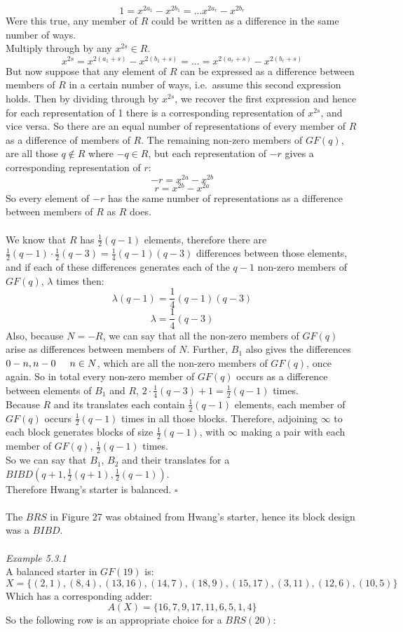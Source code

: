 \documentclass[
  12pt,
  a4paper]{book}
\begin{document}
\[1 = x^{2a_1}-x^{2b_1}=...x^{2a_r}-x^{2b_r}\] Were this true, any
member of \(R\) could be written as a difference in the same number of
ways.\\
Multiply through by any \(x^{2s} \in R\).
\[x^{2s} = x^{2(a_1+s)}-x^{2(b_1+s)}=...=x^{2(a_r+s)}-x^{2(b_r+s)}\] But
now suppose that any element of \(R\) can be expressed as a difference
between members of \(R\) in a certain number of ways, i.e.~assume this
second expression holds. Then by dividing through by \(x^{2s}\), we
recover the first expression and hence for each representation of 1
there is a corresponding representation of \(x^{2s}\), and vice versa. So
there are an equal number of representations of every member of \(R\) as a
difference of members of \(R\). The remaining non-zero members of \(GF(q)\),
are all those \(q \notin R\) where \(-q \in R\), but each representation of
\(-r\) gives a corresponding representation of \(r\): \[-r=x^{2a}-x^{2b}\]
\[r = x^{2b} - x^{2a}\] So every element of \(-r\) has the same number of
representations as a difference between members of \(R\) as \(R\) does.\\
~\\
We know that \(R\) has \(\frac{1}{2}(q-1)\) elements, therefore there are\\
\(\frac{1}{2}(q-1) \cdot \frac{1}{2} (q-3) = \frac{1}{4}(q-1)(q-3)\)
differences between those elements, and if each of these differences
generates each of the \(q-1\) non-zero members of \(GF(q)\), \(\lambda\) times
then: \[\lambda(q-1)=\frac{1}{4}(q-1)(q-3)\]
\[\lambda=\frac{1}{4}(q-3)\] Also, because \(N=-R\), we can say that all
the non-zero members of \(GF(q)\) arise as differences between members of
\(N\). Further, \(B_1\) also gives the differences
\(0-n,n-0 \hspace{0.5cm} n\in N\), which are all the non-zero members of
\(GF(q)\), once again. So in total every non-zero member of \(GF(q)\) occurs
as a difference between elements of \(B_1\) and \(R\),
\(2 \cdot \frac{1}{4} (q-3) + 1 = \frac{1}{2} (q-1)\) times.\\
Because \(R\) and its translates each contain \(\frac{1}{2}(q-1)\)
elements, each member of \(GF(q)\) occurs \(\frac{1}{2}(q-1)\) times in all
those blocks. Therefore, adjoining \(\infty\) to each block generates
blocks of size \(\frac{1}{2}(q-1)\), with \(\infty\) making a pair with
each member of \(GF(q)\), \(\frac{1}{2}(q-1)\) times.\\
So we can say that \(B_1\), \(B_2\) and their translates for a
\(BIBD(q+1,\frac{1}{2}(q+1), \frac{1}{2}(q-1))\).\\
Therefore Hwang's starter is balanced. \(\square\)\\
~\\
The \(BRS\) in Figure 27 was obtained from Hwang's starter, hence its
block design was a \(BIBD\).\\
~\\
\emph{Example 5.3.1}\\
A balanced starter in \(GF(19)\) is:
\[X = \{(2,1),(8,4),(13,16),(14,7),(18,9),(15,17),(3,11),(12,6),(10,5)\}\]
Which has a corresponding adder: \[A(X) = \{16,7,9,17,11,6,5,1,4\}\] So
the following row is an appropriate choice for a \(BRS(20)\):
\end{document}
